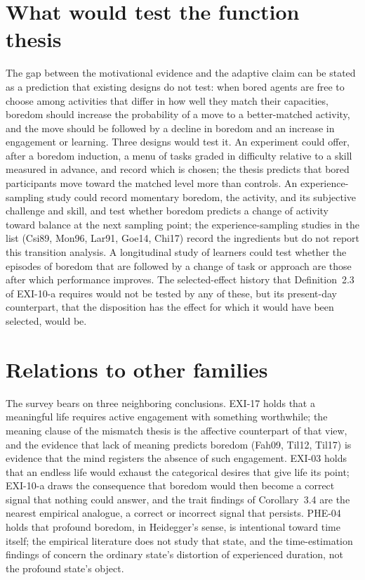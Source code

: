 \documentclass{situationist-preprint}
\begin{document}
\section{What would test the function thesis}\label{s:test}

The gap between the motivational evidence and the adaptive claim can be stated as a prediction that existing designs do not test: when bored agents are free to choose among activities that differ in how well they match their capacities, boredom should increase the probability of a move to a better-matched activity, and the move should be followed by a decline in boredom and an increase in engagement or learning. Three designs would test it. An experiment could offer, after a boredom induction, a menu of tasks graded in difficulty relative to a skill measured in advance, and record which is chosen; the thesis predicts that bored participants move toward the matched level more than controls. An experience-sampling study could record momentary boredom, the activity, and its subjective challenge and skill, and test whether boredom predicts a change of activity toward balance at the next sampling point; the experience-sampling studies in the list (Csi89, Mon96, Lar91, Goe14, Chi17) record the ingredients but do not report this transition analysis. A longitudinal study of learners could test whether the episodes of boredom that are followed by a change of task or approach are those after which performance improves. The selected-effect history that Definition~2.3 of EXI-10-a requires would not be tested by any of these, but its present-day counterpart, that the disposition has the effect for which it would have been selected, would be.

\section{Relations to other families}

The survey bears on three neighboring conclusions. EXI-17 holds that a meaningful life requires active engagement with something worthwhile; the meaning clause of the mismatch thesis is the affective counterpart of that view, and the evidence that lack of meaning predicts boredom (Fah09, Til12, Til17) is evidence that the mind registers the absence of such engagement. EXI-03 holds that an endless life would exhaust the categorical desires that give life its point; EXI-10-a draws the consequence that boredom would then become a correct signal that nothing could answer, and the trait findings of Corollary~3.4 are the nearest empirical analogue, a correct or incorrect signal that persists. PHE-04 holds that profound boredom, in Heidegger's sense, is intentional toward time itself; the empirical literature does not study that state, and the time-estimation findings of \citet{DanckertAllman2005} concern the ordinary state's distortion of experienced duration, not the profound state's object.
\end{document}
